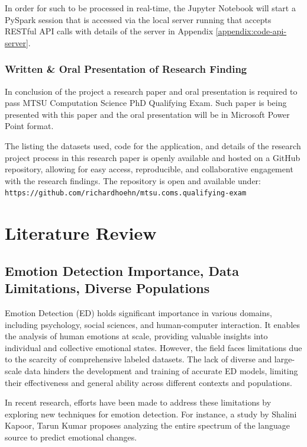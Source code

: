 \documentclass[11pt]{article}
\begin{document}
In order for such to be processed in real-time, the Jupyter Notebook will start a PySpark session that is accessed via the local server running that accepts RESTful API calls with details of the server in Appendix \ref{appendix:code-api-server}.

\subsubsection{Written \& Oral Presentation of Research Finding}
In conclusion of the project a research paper and oral presentation is required to pass MTSU Computation Science PhD Qualifying Exam. Such paper is being presented with this paper and the oral presentation will be in Microsoft Power Point format.

The listing the datasets used, code for the application, and details of the research project process in this research paper is openly available and hosted on a GitHub repository, allowing for easy access, reproducible, and collaborative engagement with the research findings. The repository is open and available under: \texttt{https://github.com/richardhoehn/mtsu.coms.qualifying-exam}\cite{Hoehn_Improving_Emotion_Detection_2023}

\section{Literature Review}

\subsection{Emotion Detection Importance, Data Limitations, Diverse Populations}
Emotion Detection (ED) holds significant importance in various domains, including psychology, social sciences, and human-computer interaction. It enables the analysis of human emotions at scale, providing valuable insights into individual and collective emotional states. However, the field faces limitations due to the scarcity of comprehensive labeled datasets. The lack of diverse and large-scale data hinders the development and training of accurate ED models, limiting their effectiveness and general ability across different contexts and populations.

In recent research, efforts have been made to address these limitations by exploring new techniques for emotion detection. For instance, a study by Shalini Kapoor, Tarun Kumar \cite{KAPOOR2023120882} proposes analyzing the entire spectrum of the language source to predict emotional changes. 
\end{document}
